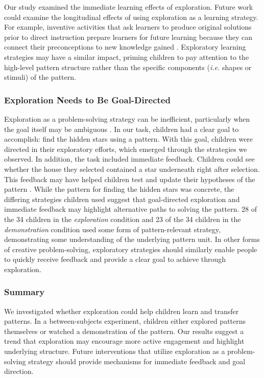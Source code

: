 Our study examined the immediate learning effects of exploration. Future work could examine the longitudinal effects of using exploration as a learning strategy. For example, inventive activities that ask learners to produce original solutions prior to direct instruction prepare learners for future learning because they can connect their preconceptions to new knowledge gained \cite{Schwartz2004}. Exploratory learning strategies may have a similar impact, priming children to pay attention to the high-level pattern structure rather than the specific components (\textit{i.e.} shapes or stimuli) of the pattern. 

\subsubsection{Exploration Needs to Be Goal-Directed}
Exploration as a problem-solving strategy can be inefficient, particularly when the goal itself may be ambiguous \cite{fraser2019replay,kirschner2006,tuovinen1999comparison}. In our task, children had a clear goal to accomplish: find the hidden stars using a pattern. With this goal, children were directed in their exploratory efforts, which emerged through the strategies we observed. In addition, the task included immediate feedback. Children could see whether the house they selected contained a star underneath right after selection. This feedback may have helped children test and update their hypotheses of the pattern \cite{sumner2019,wilson2021}. While the pattern for finding the hidden stars was concrete, the differing strategies children used suggest that goal-directed exploration and immediate feedback may highlight alternative paths to solving the pattern. 28 of the 34 children in the \textit{exploration} condition and 23 of the 34 children in the \textit{demonstration} condition used some form of pattern-relevant strategy, demonstrating some understanding of the underlying pattern unit. In other forms of creative problem-solving, exploratory strategies should similarly enable people to quickly receive feedback and provide a clear goal to achieve through exploration.

\subsubsection{Summary}
We investigated whether exploration could help children learn and transfer patterns. In a between-subjects experiment, children either explored patterns themselves or watched a demonstration of the pattern. Our results suggest a trend that exploration may encourage more active engagement and highlight underlying structure. Future interventions that utilize exploration as a problem-solving strategy should provide mechanisms for immediate feedback and goal direction.

